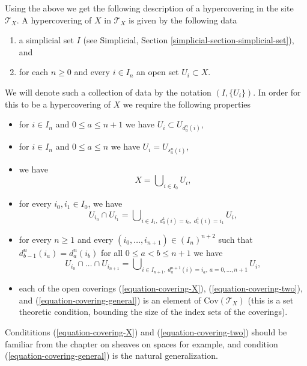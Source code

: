 \medskip\noindent
Using the above we get the following description of a hypercovering
in the site $\mathcal{T}_X$. A hypercovering of $X$ in $\mathcal{T}_X$
is given by the following data
\begin{enumerate}
\item a simplicial set $I$ (see
Simplicial, Section \ref{simplicial-section-simplicial-set}), and
\item for each $n \geq 0$ and every $i \in I_n$ an open set $U_i \subset X$.
\end{enumerate}
We will denote such a collection of data by the notation $(I, \{U_i\})$.
In order for this to be a hypercovering of $X$ we require
the following properties
\begin{itemize}
\item for $i \in I_n$ and $0 \leq a \leq n + 1$
we have $U_i \subset U_{d^n_a(i)}$,
\item for $i \in I_n$ and $0 \leq a \leq n$ we have $U_i = U_{s^n_a(i)}$,
\item we have
\begin{equation}
\label{equation-covering-X}
X = \bigcup\nolimits_{i \in I_0} U_i,
\end{equation}
\item for every $i_0, i_1 \in I_0$, we have
\begin{equation}
\label{equation-covering-two}
U_{i_0} \cap U_{i_1} =
\bigcup\nolimits_{i \in I_1, \ d^1_0(i) = i_0, \ d^1_1(i) = i_1} U_i,
\end{equation}
\item for every $n \geq 1$ and every
$(i_0, \ldots, i_{n + 1}) \in (I_n)^{n + 2}$ such that
$d^n_{b - 1}(i_a) = d^n_a(i_b)$ for all $0\leq a < b\leq n + 1$
we have
\begin{equation}
\label{equation-covering-general}
U_{i_0} \cap \ldots \cap U_{i_{n + 1}} =
\bigcup\nolimits_{i \in I_{n + 1},
\ d^{n + 1}_a(i) = i_a, \ a = 0, \ldots, n + 1} U_i,
\end{equation}
\item each of the open coverings (\ref{equation-covering-X}),
(\ref{equation-covering-two}), and (\ref{equation-covering-general})
is an element of $\text{Cov}(\mathcal{T}_X)$
(this is a set theoretic condition, bounding
the size of the index sets of the coverings).
\end{itemize}
Condititions (\ref{equation-covering-X}) and
(\ref{equation-covering-two}) should be familiar from the
chapter on sheaves on spaces for example, and condition
(\ref{equation-covering-general}) is the natural generalization.


